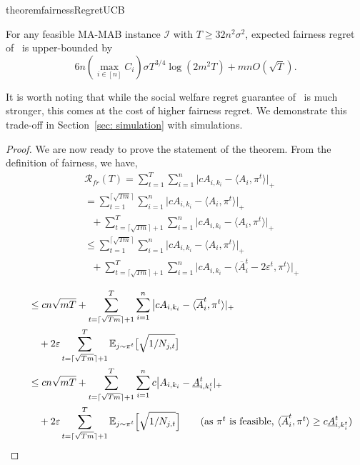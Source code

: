 \begin{restatable}{theorem}{fairnessRegretUCB}
\label{thm:fairnesRegretUCB}


For any feasible MA-MAB instance $\mathcal{I}$ with   $T\geq 32n^2\sigma^2$,     expected fairness regret of \ouralgo \ is upper-bounded by
$$ 6n(\textstyle \max_{i\in [n]} C_i)\sigma T^{3/4}\log{(2m^2T)} + mnO(\sqrt{T}). $$
\end{restatable}

It is worth noting that while the social welfare regret guarantee of \ouralgo\ is much stronger, this comes at the cost of higher  fairness  regret. We demonstrate this trade-off in  Section~\ref{sec: simulation} with simulations. 
\iffalse 
\begin{proof}
We are now ready to prove the statement of the theorem. From the definition of fairness, we have, 
\begin{align*}
 &\mathcal{R}_{fr}(T)  =  \sum_{t=1}^T \sum_{i=1}^n \big | c A_{i, k_i}  -   \langle A_i, \pi^t \rangle  \big|_{+} \\ 
& = \sum_{t=1}^{\lceil \sqrt{T m} \rceil } \sum_{i=1}^n \big | c A_{i, k_i}  -   \langle A_i, \pi^t \rangle  \big|_{+}  \\ &  \ \ \ +  \sum_{t= \lceil \sqrt{T m} \rceil + 1}^T \sum_{i=1}^n \big | c A_{i, k_i}  -   \langle A_i, \pi^t \rangle  \big|_{+} \\
& \leq \sum_{t=1}^{\lceil \sqrt{T m} \rceil } \sum_{i=1}^n \big | c A_{i, k_i}  -   \langle A_i, \pi^t \rangle \big|_{+} \\   \ \ &  \ \ \ + \sum_{t= \lceil \sqrt{T m} \rceil +1 }^T \sum_{i=1}^n \big | c A_{i, k_i}  -    \langle \overline{A}_i^t   -   2\varepsilon^{t},  \pi^t \rangle |_+ \tag{wp $ \geq 1-\delta$}\\ 
\end{align*}
\begin{align*}
&\leq cn\sqrt{mT} + \sum_{t=\lceil \sqrt{T m} \rceil +1}^T \sum_{i=1}^n \big | c A_{i, k_i}  -   \langle \overline{A}_i^t, \pi^t \rangle |_+   \\ \ \ \ &   \ \ \ +   2 \varepsilon \sum_{t=\lceil \sqrt{T m} \rceil +1}^T \mathbb{E}_{j \sim \pi^t} \big [ \sqrt{1/N_{j,t}} \big ] \\ 
&\leq  cn\sqrt{mT} + \sum_{t=\lceil \sqrt{T m} \rceil +1}^T \sum_{i=1}^n c \big  |  A_{i, k_i}  -   \underline{A}_{i, k_i^t}^t|_+   \\  &  \  \ \ +   2 \varepsilon \sum_{t=\lceil \sqrt{T m} \rceil +1}^T \mathbb{E}_{j \sim \pi^t} \Big [\sqrt{1/N_{j,t}} \Big ] \tag{as $\pi^t$ is feasible, $ \langle \overline{A}_i^t, \pi^t \rangle \geq c \underline{A}_{i, k_i^t}^t $}  \\ 

\end{align*}
\end{proof}
